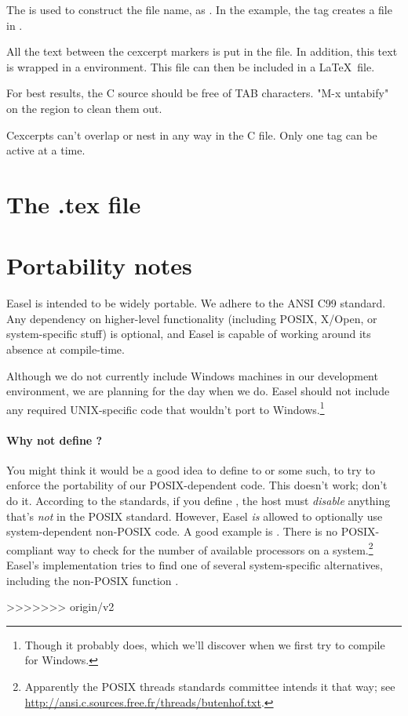 The  is used to construct the file name, as
.  In the example, the tag  creates
a file  in .

All the text between the cexcerpt markers is put in the file.  In
addition, this text is wrapped in a  environment.  This
file can then be included in a \LaTeX\ file.

For best results, the C source should be free of TAB characters.
"M-x untabify" on the region to clean them out.

Cexcerpts can't overlap or nest in any way in the C file. Only one tag
can be active at a time.

\section{The .tex file}




\section{Portability notes}

Easel is intended to be widely portable. We adhere to the ANSI C99
standard. Any dependency on higher-level functionality (including
POSIX, X/Open, or system-specific stuff) is optional, and Easel is
capable of working around its absence at compile-time.

Although we do not currently include Windows machines in our
development environment, we are planning for the day when we do. Easel
should not include any required UNIX-specific code that wouldn't port
to Windows.\footnote{Though it probably does, which we'll discover
  when we first try to compile for Windows.}


\paragraph{Why not define ?} You might think
it would be a good idea to define  to
 or some such, to try to enforce the portability of our
POSIX-dependent code. This doesn't work; don't do it.  According to
the standards, if you define , the host must
\emph{disable} anything that's \emph{not} in the POSIX
standard. However, Easel \emph{is} allowed to optionally use
system-dependent non-POSIX code. A good example is
. There is no
POSIX-compliant way to check for the number of available processors on
a system.\footnote{Apparently the POSIX threads standards committee
  intends it that way; see
  \url{http://ansi.c.sources.free.fr/threads/butenhof.txt}.} 
Easel's implementation tries to find one of several system-specific
alternatives, including the non-POSIX function . 




>>>>>>> origin/v2
